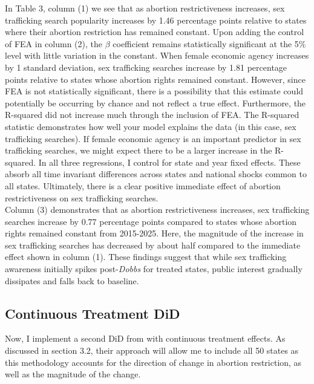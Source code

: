 In Table 3, column (1) we see that as abortion restrictiveness increases, sex trafficking search popularity increases by 1.46 percentage points relative to states where their abortion restriction has remained constant. Upon adding the control of FEA in column (2), the $\beta$ coefficient remains statistically significant at the 5\% level with little variation in the constant. When female economic agency increases by 1 standard deviation, sex trafficking searches increase by 1.81 percentage points relative to states whose abortion rights remained constant. However, since FEA is not statistically significant, there is a possibility that this estimate could potentially be occurring by chance and not reflect a true effect. Furthermore, the R-squared did not increase much through the inclusion of FEA. The R-squared statistic demonstrates how well your model explains the data (in this case, sex trafficking searches). If female economic agency is an important predictor in sex trafficking searches, we might expect there to be a larger increase in the R-squared. In all three regressions, I control for state and year fixed effects. These absorb all time invariant differences across states and national shocks common to all states. Ultimately, there is a clear positive immediate effect of abortion restrictiveness  on sex trafficking searches. \\
\indent Column (3) demonstrates that as abortion restrictiveness increases, sex trafficking searches increase by 0.77 percentage points compared to states whose abortion rights remained constant from 2015-2025. Here, the magnitude of the increase in sex trafficking searches has decreased by about half compared to the immediate effect shown in column (1). These findings suggest that while sex trafficking awareness initially spikes post-\textit{Dobbs} for treated states, public interest gradually dissipates and falls back to baseline. 

\subsection{Continuous Treatment DiD}
Now, I implement a second DiD from \cite{diff2} with continuous treatment effects. As discussed in section 3.2, their approach will allow me to include all 50 states as this methodology accounts for the direction of change in abortion restriction, as well as the magnitude of the change. \\

